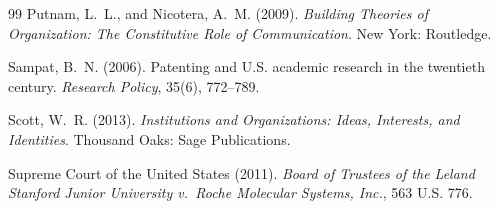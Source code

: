 \documentclass[12pt]{article}
\begin{document}
\begin{thebibliography}{99}
Putnam, L.~L., and Nicotera, A.~M. (2009).
\newblock \textit{Building Theories of Organization: The Constitutive Role
  of Communication}.
\newblock New York: Routledge.

Sampat, B.~N. (2006).
\newblock Patenting and U.S. academic research in the twentieth century.
\newblock \textit{Research Policy}, 35(6), 772--789.

Scott, W.~R. (2013).
\newblock \textit{Institutions and Organizations: Ideas, Interests, and
  Identities}.
\newblock Thousand Oaks: Sage Publications.

Supreme Court of the United States (2011).
\newblock \textit{Board of Trustees of the Leland Stanford Junior University
  v.\ Roche Molecular Systems, Inc.}, 563 U.S. 776.

\end{thebibliography}
\end{document}
